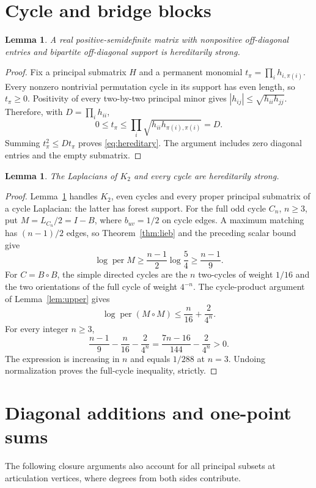 \documentclass[11pt]{article}
\newtheorem{lemma}[theorem]{Lemma}
\theoremstyle{remark}\newtheorem{remark}[theorem]{Remark}
\DeclareMathOperator{\per}{per}
\begin{document}
\section{Cycle and bridge blocks}\label{sec:cycles}
\begin{lemma}\label{lem:bipartite}
A real positive-semidefinite matrix with nonpositive off-diagonal entries
and bipartite off-diagonal support is hereditarily strong.
\end{lemma}
\begin{proof}
Fix a principal submatrix $H$ and a permanent monomial
$t_\pi=\prod_i h_{i,\pi(i)}$. Every nonzero nontrivial permutation cycle
in its support has even length, so $t_\pi\ge0$. Positivity of every
two-by-two principal minor gives $|h_{ij}|\le\sqrt{h_{ii}h_{jj}}$.
Therefore, with $D=\prod_i h_{ii}$,
\[
0\le t_\pi\le\prod_i\sqrt{h_{ii}h_{\pi(i),\pi(i)}}=D.
\]
Summing $t_\pi^2\le D t_\pi$ proves \eqref{eq:hereditary}.
The argument includes zero diagonal entries and the empty submatrix.
\end{proof}

\begin{lemma}\label{lem:cycles}
The Laplacians of $K_2$ and every cycle are hereditarily strong.
\end{lemma}
\begin{proof}
Lemma~\ref{lem:bipartite} handles $K_2$, even cycles and every proper
principal submatrix of a cycle Laplacian: the latter has forest support.
For the full odd cycle $C_n$, $n\ge3$, put $M=L_{C_n}/2=I-B$,
where $b_{uv}=1/2$ on cycle edges. A maximum matching has $(n-1)/2$
edges, so Theorem~\ref{thm:lieb} and the preceding scalar bound give
\[
\log\per M\ge\frac{n-1}{2}\log\frac54\ge\frac{n-1}{9}.
\]
For $C=B\circ B$, the simple directed cycles are the $n$ two-cycles
of weight $1/16$ and the two orientations of the full cycle of weight
$4^{-n}$. The cycle-product argument of Lemma~\ref{lem:upper} gives
\[
\log\per(M\circ M)\le\frac n{16}+\frac2{4^n}.
\]
For every integer $n\ge3$,
\[
\frac{n-1}{9}-\frac n{16}-\frac2{4^n}
=\frac{7n-16}{144}-\frac2{4^n}>0.
\]
The expression is increasing in $n$ and equals $1/288$ at $n=3$.
Undoing normalization proves the full-cycle inequality, strictly.
\end{proof}

\section{Diagonal additions and one-point sums}\label{sec:closure}
The following closure arguments also account for all principal subsets
at articulation vertices, where degrees from both sides contribute.
\end{document}
